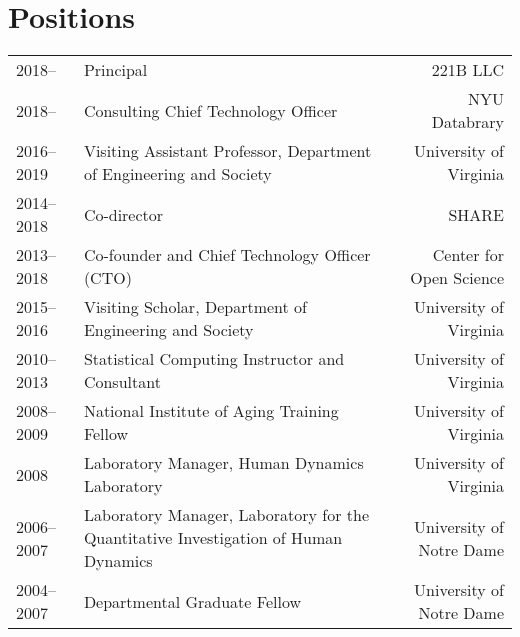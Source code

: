 \documentclass[11pt]{article}
\begin{document}
\maketitle


\section*{Positions}
\begin{tabularx}{\textwidth}{l X r}
2018--				& Principal & 221B LLC\\
2018--				& Consulting Chief Technology Officer & NYU Databrary\\
2016--2019				& Visiting Assistant Professor, Department of Engineering and Society & University of Virginia \\
2014--2018  	& Co-director & SHARE \\
2013--2018		& Co-founder and Chief Technology Officer (CTO) & Center for Open Science\\
2015--2016		& Visiting Scholar, Department of Engineering and Society & University of Virginia \\
2010--2013 	& Statistical Computing Instructor and Consultant &  University of Virginia\\
2008--2009 	& National Institute of Aging Training Fellow & University of Virginia\\
2008 				& Laboratory Manager, Human Dynamics Laboratory & University of Virginia\\
2006--2007 	& Laboratory Manager, Laboratory for the Quantitative Investigation of Human Dynamics & University of Notre Dame\\
2004--2007 	& Departmental Graduate Fellow & University of Notre Dame\\
\end{tabularx}
\end{document}
